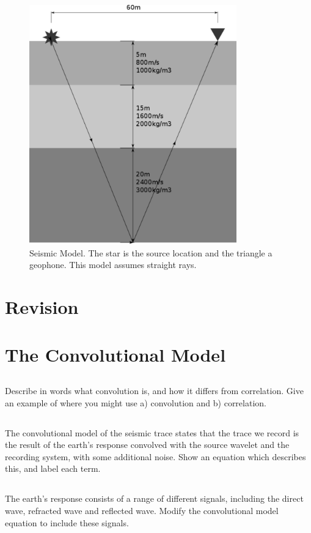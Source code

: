 \begin{figure}[h]
\centering
\includegraphics[width=0.8\textwidth]{model.pdf}
\caption{Seismic Model. The star is the source location and the triangle a geophone. This model assumes straight rays.}
\end{figure}
\newpage
\section*{Revision}
\section{The Convolutional Model}
\subsection{}
Describe in words what convolution is, and how it differs from correlation. Give an example of where you might use a) convolution and b) correlation.
\subsection{}
The convolutional model of the seismic trace states that the trace we record is the result of the earth's response convolved with the source wavelet and the recording system, with some additional noise. Show an equation which describes this, and label each term.
\subsection{}
The earth's response consists of a range of different signals, including the direct wave, refracted wave and reflected wave.  Modify the convolutional model equation to include these signals.

